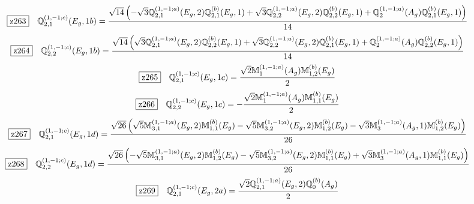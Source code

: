 \documentclass[fleqn,10pt,landscape]{jsarticle}
\begin{document}
\begin{dmath*}
\hspace*{3mm}\fbox{z263}\quad \mathbb{Q}_{2,1}^{(1,-1;c)}(E_{g},1b)=\frac{\sqrt{14} \left(- \sqrt{3} \mathbb{Q}_{2,1}^{(1,-1;a)}(E_{g},2) \mathbb{Q}_{2,1}^{(b)}(E_{g},1) + \sqrt{3} \mathbb{Q}_{2,2}^{(1,-1;a)}(E_{g},2) \mathbb{Q}_{2,2}^{(b)}(E_{g},1) + \mathbb{Q}_{2}^{(1,-1;a)}(A_{g}) \mathbb{Q}_{2,1}^{(b)}(E_{g},1)\right)}{14}
\end{dmath*}
\begin{dmath*}
\hspace*{3mm}\fbox{z264}\quad \mathbb{Q}_{2,2}^{(1,-1;c)}(E_{g},1b)=\frac{\sqrt{14} \left(\sqrt{3} \mathbb{Q}_{2,1}^{(1,-1;a)}(E_{g},2) \mathbb{Q}_{2,2}^{(b)}(E_{g},1) + \sqrt{3} \mathbb{Q}_{2,2}^{(1,-1;a)}(E_{g},2) \mathbb{Q}_{2,1}^{(b)}(E_{g},1) + \mathbb{Q}_{2}^{(1,-1;a)}(A_{g}) \mathbb{Q}_{2,2}^{(b)}(E_{g},1)\right)}{14}
\end{dmath*}
\begin{dmath*}
\hspace*{3mm}\fbox{z265}\quad \mathbb{Q}_{2,1}^{(1,-1;c)}(E_{g},1c)=\frac{\sqrt{2} \mathbb{M}_{1}^{(1,-1;a)}(A_{g}) \mathbb{M}_{1,2}^{(b)}(E_{g})}{2}
\end{dmath*}
\begin{dmath*}
\hspace*{3mm}\fbox{z266}\quad \mathbb{Q}_{2,2}^{(1,-1;c)}(E_{g},1c)=- \frac{\sqrt{2} \mathbb{M}_{1}^{(1,-1;a)}(A_{g}) \mathbb{M}_{1,1}^{(b)}(E_{g})}{2}
\end{dmath*}
\begin{dmath*}
\hspace*{3mm}\fbox{z267}\quad \mathbb{Q}_{2,1}^{(1,-1;c)}(E_{g},1d)=\frac{\sqrt{26} \left(\sqrt{5} \mathbb{M}_{3,1}^{(1,-1;a)}(E_{g},2) \mathbb{M}_{1,1}^{(b)}(E_{g}) - \sqrt{5} \mathbb{M}_{3,2}^{(1,-1;a)}(E_{g},2) \mathbb{M}_{1,2}^{(b)}(E_{g}) - \sqrt{3} \mathbb{M}_{3}^{(1,-1;a)}(A_{g},1) \mathbb{M}_{1,2}^{(b)}(E_{g})\right)}{26}
\end{dmath*}
\begin{dmath*}
\hspace*{3mm}\fbox{z268}\quad \mathbb{Q}_{2,2}^{(1,-1;c)}(E_{g},1d)=\frac{\sqrt{26} \left(- \sqrt{5} \mathbb{M}_{3,1}^{(1,-1;a)}(E_{g},2) \mathbb{M}_{1,2}^{(b)}(E_{g}) - \sqrt{5} \mathbb{M}_{3,2}^{(1,-1;a)}(E_{g},2) \mathbb{M}_{1,1}^{(b)}(E_{g}) + \sqrt{3} \mathbb{M}_{3}^{(1,-1;a)}(A_{g},1) \mathbb{M}_{1,1}^{(b)}(E_{g})\right)}{26}
\end{dmath*}
\begin{dmath*}
\hspace*{3mm}\fbox{z269}\quad \mathbb{Q}_{2,1}^{(1,-1;c)}(E_{g},2a)=\frac{\sqrt{2} \mathbb{Q}_{2,1}^{(1,-1;a)}(E_{g},2) \mathbb{Q}_{0}^{(b)}(A_{g})}{2}
\end{dmath*}
\end{document}
